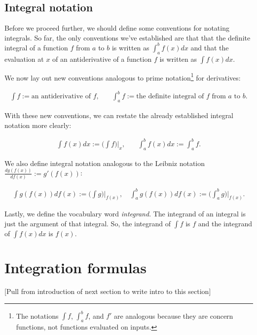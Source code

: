 \subsection*{Integral notation}

Before we proceed further, we should define some conventions for notating integrals. So far, the only conventions we've established are that that the definite integral of a function $f$ from $a$ to $b$ is written as $\int_a^b f(x) dx$ and that the evaluation at $x$ of an antiderivative of a function $f$ is written as $\int f(x) dx$. 

We now lay out new conventions analogous to prime notation\footnote{The notations $\int f$, $\int_a^b f$, and $f'$ are analogous because they are concern functions, not functions evaluated on inputs.} for derivatives:

\begin{align*}
    \int f := \text{an antiderivative of $f$}, &\quad \int_a^b f := \text{the definite integral of $f$ from $a$ to $b$}.
\end{align*}

With these new conventions, we can restate the already established integral notation more clearly:

\begin{align*}
    \int f(x) dx := \Big(\int f\Big)\Big|_x, &\quad \int_a^b f(x) dx := \int_a^b f.
\end{align*}

We also define integral notation analogous to the Leibniz notation $\frac{dg(f(x))}{df(x)} := g'(f(x))$:

\begin{align*}
    \int g(f(x)) df(x) := \Big(\int g\Big)\Big|_{f(x)}, \quad \int_a^b g(f(x)) df(x) := \Big(\int_a^b g\Big)\Big|_{f(x)}.
\end{align*}

\vspace{.5cm}

Lastly, we define the vocabulary word \textit{integrand}. The integrand of an integral is just the argument of that integral. So, the integrand of $\int f$ is $f$ and the integrand of $\int f(x) dx$ is $f(x)$.

\section*{Integration formulas}

[Pull from introduction of next section to write intro to this section]

